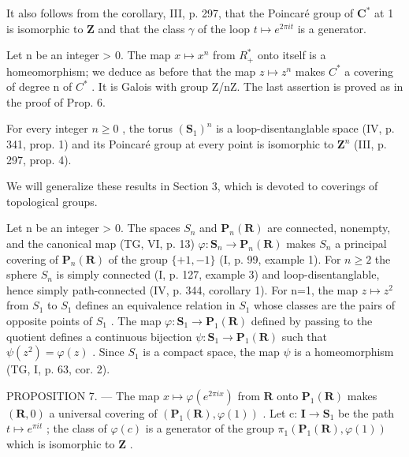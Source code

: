 It also follows from the corollary, III, p. 297, that the Poincaré group of \(\mathbf{C}^*\) at 1 is isomorphic to \(\mathbf{Z}\) and that the class \(\gamma\) of the loop \(t \mapsto e^{2\pi it}\) is a generator.

  Let n be an integer \textgreater{} 0. The map \(x \mapsto x^{n}\) from \(R_{+}^{*}\) onto itself is a homeomorphism; we deduce as before that the map \(z \mapsto z^{n}\) makes \(C^{*}\) a covering of degree n of \(C^{*}\) . It is Galois with group Z/nZ. The last assertion is proved as in the proof of Prop. 6.

For every integer \(n \geqslant 0\) , the torus \((\mathbf{S}_{1})^{n}\) is a loop-disentanglable space (IV, p. 341, prop. 1) and its Poincaré group at every point is isomorphic to \(\mathbf{Z}^{n}\) (III, p. 297, prop. 4).

We will generalize these results in Section 3, which is devoted to coverings of topological groups.


Let n be an integer \textgreater{} 0. The spaces \(S_{n}\) and \(\mathbf{P}_{n}(\mathbf{R})\) are connected, nonempty, and the canonical map (TG, VI, p. 13) \(\varphi\colon\mathbf{S}_{n}\to\mathbf{P}_{n}(\mathbf{R})\) makes \(S_{n}\) a principal covering of \(\mathbf{P}_{n}(\mathbf{R})\) of the group \(\{+1,-1\}\) (I, p. 99, example 1). For \(n\geqslant2\) the sphere \(S_{n}\) is simply connected (I, p. 127, example 3) and loop-disentanglable, hence simply path-connected (IV, p. 344, corollary 1). For n=1, the map \(z\mapsto z^{2}\) from \(S_{1}\) to \(S_{1}\) defines an equivalence relation in \(S_{1}\) whose classes are the pairs of opposite points of \(S_{1}\) . The map \(\varphi\colon\mathbf{S}_{1}\to\mathbf{P}_{1}(\mathbf{R})\) defined by passing to the quotient defines a continuous bijection \(\psi\colon\mathbf{S}_{1}\to\mathbf{P}_{1}(\mathbf{R})\) such that \(\psi(z^{2})=\varphi(z)\) . Since \(S_{1}\) is a compact space, the map \(\psi\) is a homeomorphism (TG, I, p. 63, cor. 2).

PROPOSITION 7. --- The map \(x \mapsto \varphi(e^{2\pi ix})\) from \(\mathbf{R}\) onto \(\mathbf{P}_{1}(\mathbf{R})\) makes \((\mathbf{R},0)\) a universal covering of \((\mathbf{P}_{1}(\mathbf{R}),\varphi(1))\) . Let c: \(\mathbf{I} \to \mathbf{S}_{1}\) be the path \(t \mapsto e^{\pi it}\) ; the class of \(\varphi(c)\) is a generator of the group \(\pi_1(\mathbf{P}_{1}(\mathbf{R}), \varphi(1))\) which is isomorphic to \(\mathbf{Z}\) .

